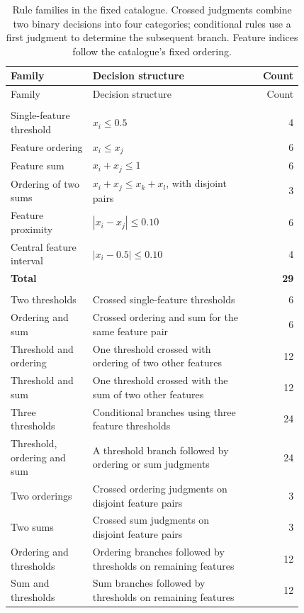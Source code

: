 {\small
\begin{longtable}{>{\raggedright\arraybackslash}p{0.28\linewidth}>{\raggedright\arraybackslash}p{0.54\linewidth}r}
\caption{Rule families in the fixed catalogue. Crossed judgments combine two binary decisions into four categories; conditional rules use a first judgment to determine the subsequent branch. Feature indices follow the catalogue's fixed ordering.}\label{tab:rule-catalogue}\\
\toprule
Family & Decision structure & Count\\
\midrule
\endfirsthead
\toprule
Family & Decision structure & Count\\
\midrule
\endhead
\multicolumn{3}{l}{\textit{Two-category catalogue}}\\*
Single-feature threshold & $x_i\leq0.5$ & 4\\
Feature ordering & $x_i\leq x_j$ & 6\\
Feature sum & $x_i+x_j\leq1$ & 6\\
Ordering of two sums & $x_i+x_j\leq x_k+x_l$, with disjoint pairs & 3\\
Feature proximity & $|x_i-x_j|\leq0.10$ & 6\\
Central feature interval & $|x_i-0.5|\leq0.10$ & 4\\
\textbf{Total} & & \textbf{29}\\
\midrule
\multicolumn{3}{l}{\textit{Four-category catalogue}}\\*
Two thresholds & Crossed single-feature thresholds & 6\\
Ordering and sum & Crossed ordering and sum for the same feature pair & 6\\
Threshold and ordering & One threshold crossed with ordering of two other features & 12\\
Threshold and sum & One threshold crossed with the sum of two other features & 12\\
Three thresholds & Conditional branches using three feature thresholds & 24\\
Threshold, ordering and sum & A threshold branch followed by ordering or sum judgments & 24\\
Two orderings & Crossed ordering judgments on disjoint feature pairs & 3\\
Two sums & Crossed sum judgments on disjoint feature pairs & 3\\
Ordering and thresholds & Ordering branches followed by thresholds on remaining features & 12\\
Sum and thresholds & Sum branches followed by thresholds on remaining features & 12\\

\end{longtable}}
